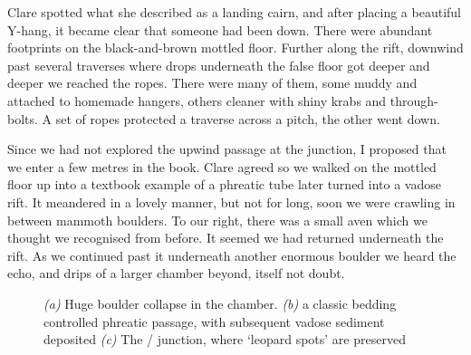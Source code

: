 Clare spotted what she described as a landing cairn, and after placing a beautiful Y-hang, it became clear that someone had been down. There were abundant footprints on the black-and-brown mottled floor. Further along the rift, downwind past several traverses where drops underneath the false floor got deeper and deeper we reached the ropes. There were many of them, some muddy and attached to homemade hangers, others cleaner with shiny krabs and through-bolts. A set of ropes protected a traverse across a pitch, the other went down.


Since we had not explored the upwind passage at the junction, I proposed that we enter a few metres in the book. Clare agreed so we walked on the mottled floor up into a textbook example of a phreatic tube later turned into a vadose rift. It meandered in a lovely manner, but not for long, soon we were crawling in between mammoth boulders. To our right, there was a small aven which we thought we recognised from before. It seemed we had returned underneath the  rift. As we continued past it underneath another enormous boulder we heard the echo, and drips of a larger chamber beyond,  itself not doubt.

\begin{figure}[t!]
\checkoddpage \ifoddpage \forcerectofloat \else \forceversofloat \fi
\centering
    \begin{subfigure}[t]{0.353\textwidth}
        \centering
        
        \caption{} \label{traverse over buckwheat}
    \end{subfigure}
        \hfill
\begin{subfigure}[t]{0.63\textwidth}
\centering
{}
 \caption{}\label{passage in Deja VU}
\end{subfigure}
    \vspace{0cm}
    \begin{subfigure}[t]{\textwidth}
    \centering
       
        \caption{} \label{Deja vu}
    \end{subfigure}
    \caption{
    \textit{(a)} Huge boulder collapse in the \protect{} chamber.  
     \textit{(b)} \protect{} a classic bedding controlled phreatic passage, with subsequent vadose sediment deposited
     \textit{(c)} The  \protect{}/ \protect{} junction, where `leopard spots' are preserved }
\end{figure}


